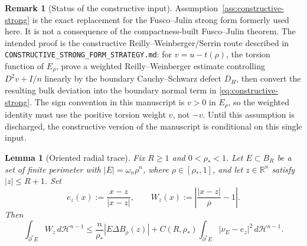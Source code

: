 \documentclass[11pt]{amsart}
\newtheorem{lemma}[theorem]{Lemma}
\theoremstyle{definition}
\newtheorem{remark}[theorem]{Remark}
\newcommand{\R}{\mathbb R}
\newcommand{\rstar}{\rho_*}
\newcommand{\Hn}{\mathcal H^{n-1}}
\begin{document}
\begin{remark}[Status of the constructive input]
\label{rem:constructive-strong-status}
Assumption~\ref{ass:constructive-strong} is the exact replacement for the
Fusco--Julin strong form formerly used here.  It is not a consequence of the
compactness-built Fusco--Julin theorem.  The intended proof is the constructive
Reilly--Weinberger/Serrin route described in
\texttt{CONSTRUCTIVE\_STRONG\_FORM\_STRATEGY.md}: for
\(v=u-t(\rho)\), the torsion function of \(E_\rho\), prove a weighted
Reilly--Weinberger estimate controlling
\(D^2v+I/n\) linearly by the boundary Cauchy--Schwarz defect \(D_H\), then
convert the resulting bulk deviation into the boundary normal term in
\eqref{eq:constructive-strong}.  The sign convention in this manuscript is
\(v>0\) in \(E_\rho\), so the weighted identity must use the positive torsion
weight \(v\), not \(-v\).  Until this assumption is discharged, the constructive
version of the manuscript is conditional on this single input.
\end{remark}

\begin{lemma}[Oriented radial trace]\label{lem:oriented-radial-trace}
Fix \(R\ge1\) and \(0<\rstar<1\).  Let \(E\subset B_R\) be a set of finite
perimeter with \(|E|=\omega_n\rho^n\), where \(\rho\in[\rstar,1]\), and
let \(z\in\R^n\) satisfy \(|z|\le R+1\).  Set
\[
   e_z(x):=\frac{x-z}{|x-z|},\qquad
   W_z(x):=\left|\frac{|x-z|}{\rho}-1\right|.
\]
Then
\begin{equation}\label{eq:oriented-radial-trace}
   \int_{\partial^*E} W_z\,d\Hn
   \le
   \frac{n}{\rstar}|E\Delta B_\rho(z)|
   +
   C(R,\rstar)
   \int_{\partial^*E}|\nu_E-e_z|^2\,d\Hn .
\end{equation}
\end{lemma}
\end{document}
